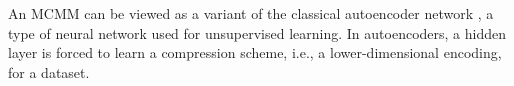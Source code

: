 


An MCMM can be viewed as a variant of the classical autoencoder
network \citep{dayan-and-zemel:95}, a type of neural network used for
unsupervised learning.  In autoencoders, a hidden layer is forced to
learn a compression scheme, i.e., a lower-dimensional encoding, for
a dataset.
 

